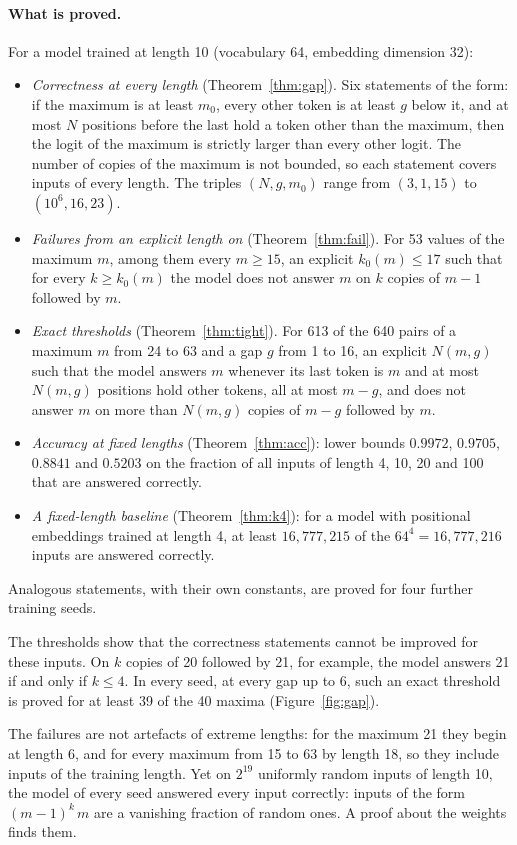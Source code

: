 \documentclass[11pt,a4paper]{article}
\begin{document}
\paragraph{What is proved.}
For a model trained at length 10 (vocabulary 64, embedding dimension 32):
\begin{itemize}
\item \emph{Correctness at every length} (Theorem~\ref{thm:gap}). Six statements
of the form: if the maximum is at least $m_0$, every other token is at least $g$
below it, and at most $N$ positions before the last hold a token other than the
maximum, then the logit of the maximum is strictly larger than every other
logit. The number of copies of the maximum is not bounded, so each statement
covers inputs of every length. The triples $(N,g,m_0)$ range from $(3,1,15)$ to
$(10^6,16,23)$.
\item \emph{Failures from an explicit length on} (Theorem~\ref{thm:fail}). For
53 values of the maximum $m$, among them every $m\ge15$, an explicit
$k_0(m)\le17$ such that for every $k\ge k_0(m)$ the model does not answer $m$
on $k$ copies of $m-1$ followed by $m$.
\item \emph{Exact thresholds} (Theorem~\ref{thm:tight}). For 613 of the 640
pairs of a maximum $m$ from 24 to 63 and a gap $g$ from 1 to 16, an explicit
$N(m,g)$ such that the model answers $m$ whenever its last token is $m$ and at
most $N(m,g)$ positions hold other tokens, all at most $m-g$, and does not
answer $m$ on more than $N(m,g)$ copies of $m-g$ followed by $m$.
\item \emph{Accuracy at fixed lengths} (Theorem~\ref{thm:acc}): lower bounds
$0.9972$, $0.9705$, $0.8841$ and $0.5203$ on the fraction of all inputs of
length 4, 10, 20 and 100 that are answered correctly.
\item \emph{A fixed-length baseline} (Theorem~\ref{thm:k4}): for a model with
positional embeddings trained at length 4, at least $16{,}777{,}215$ of the
$64^4=16{,}777{,}216$ inputs are answered correctly.
\end{itemize}
Analogous statements, with their own constants, are proved for four further
training seeds.

The thresholds show that the correctness statements cannot be improved for
these inputs. On $k$ copies of 20 followed by 21, for example, the model
answers 21 if and only if $k\le4$. In every seed, at every gap up to 6, such an
exact threshold is proved for at least 39 of the 40 maxima
(Figure~\ref{fig:gap}).

The failures are not artefacts of extreme lengths: for the maximum 21 they begin
at length 6, and for every maximum from 15 to 63 by length 18, so they include
inputs of the training length. Yet on $2^{19}$ uniformly random inputs of
length 10, the model of every seed answered every input correctly: inputs of
the form $(m-1)^k\,m$ are a vanishing fraction of random ones. A proof about
the weights finds them.
\end{document}
